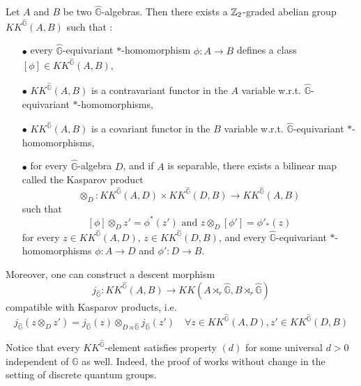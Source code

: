 \begin{prop}
Let $A$ and $B$ be two $\hat{\mathbb G}$-algebras. Then there exists a $\mathbb Z_2$-graded abelian group $KK^{\hat{\mathbb G}}(A,B) $ such that :
\begin{itemize}
\item[$\bullet$] every $\hat{\mathbb G}$-equivariant $*$-homomorphism $\phi : A\rightarrow B$ defines a class $[\phi]\in KK^{\hat{\mathbb G}}(A,B)$,
\item[$\bullet$] $KK^{\hat{\mathbb G}}(A,B)$ is a contravariant functor in the $A$ variable w.r.t. $\hat{\mathbb G}$-equivariant $*$-homomorphisms,
\item[$\bullet$] $KK^{\hat{\mathbb G}}(A,B)$ is a covariant functor in the $B$ variable w.r.t. $\hat{\mathbb G}$-equivariant $*$-homomorphisms,
\item[$\bullet$] for every $\hat{\mathbb G}$-algebra $D$, and if $A$ is separable, there exists a bilinear map called the Kasparov product 
\[\otimes_D : KK^{\hat{\mathbb G}}(A,D)\times KK^{\hat{\mathbb G}}(D,B)  \rightarrow  KK^{\hat{\mathbb G}}(A,B)\]
such that 
\[ [\phi]\otimes_D z' = \phi^*(z') \text{ and } z\otimes_D[\phi'] = \phi'_*(z)\]
for every $z\in KK^{\hat{\mathbb G}}(A,D)$, $z\in KK^{\hat{\mathbb G}}(D,B)$, and every $\hat{\mathbb G}$-equivariant $*$-homomorphisms $\phi : A \rightarrow D$ and $\phi' : D\rightarrow B$.
\end{itemize}
Moreover, one can construct a descent morphism
\[j_{\hat{\mathbb G}} : KK^{\hat{\mathbb G}}(A,B)\rightarrow KK(A\rtimes_r \hat{\mathbb G},B\rtimes_r \hat{\mathbb G})\]
compatible with Kasparov products, i.e. 
\[j_{\hat{\mathbb G}}(z\otimes_D z') = j_{\hat{\mathbb G}}(z)\otimes_{D\rtimes \hat{\mathbb G}} j_{\hat{\mathbb G}}(z')\quad \forall z\in KK^{\hat{\mathbb G}}(A,D),z'\in KK^{\hat{\mathbb G}}(D,B) \]
\end{prop}

Notice that every $KK^{\hat{\mathbb G}}$-element satisfies property $(d)$ for some universal $d>0$ independent of $\mathbb G$ as well. Indeed, the proof of \cite{LaffOY} works without change in the setting of discrete quantum groups.































